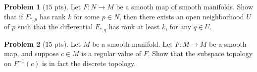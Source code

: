 \documentclass{amsart}
\newcommand{\+}[1]{\ensuremath{\mathbf{#1}}}
\newcommand{\R}{{\mathbb R}}
\theoremstyle{definition}
\newtheorem{prob}{Problem}
\begin{document}
\begin{comment}
\begin{prob}[$15$ pts]
Let $X = y^2 \frac{\partial}{\partial x}$ and $Y = x^2 \frac{\partial}{\partial y}$
be vector fields on $\R^2$.
Compute the Lie bracket $[X,Y]$.  Namely, determine smooth functions $f(x,y)$ and $g(x,y)$ for which
 $[X,Y] = f(x,y) \frac{\partial}{\partial x} + g(x,y) \frac{\partial}{\partial y}$.
\end{prob}


\vspace{3mm}
\end{comment}



\begin{comment}
\begin{prob}[$15$ pts]
Determine whether each of the following statements is true or false.  If false, provide a counterexample.  If true, briefly justify your answer.
\begin{enumerate}[(a)]
 \item Let $F: N \to M$ be a one-to-one immersion, and let $n$ and $m$ denote the dimensions of $N$ and $M$ respectively.
 For any point $q \in F(N) \subset M$, there exists a coordinate neighborhood $(U, x^1, \ldots, x^m)$ about $q$ such that
 $F(N) \cap U$ is defined by the vanishing of $x^1, \ldots, x^{m-n}$.
 \item Any alternating bilinear map $\omega \in A_2(\R^3)$ is \emph{decomposable}, 
 in the sense that $\omega = \alpha_1 \wedge \alpha_2$ for some
 covectors $\alpha_1, \alpha_2 \in V^*$.
  \item Any smooth vector field on the torus vanishes on at least one point.
\end{enumerate}
\end{prob}
\vspace{3mm}
\end{comment}


\begin{prob}[$15$ pts]
Let $F: N \to M$ be a smooth map of smooth manifolds.
Show that if $F_{*,p}$ has rank $k$ for some $p \in N$,
then there exists an open neighborhood $U$ of $p$ such that 
the differential $F_{*,q}$ has rank at least $k$, for any $q \in U$.
\end{prob}


\vspace{3mm}

\begin{prob}[$15$ pts]
 Let $M$ be a smooth manifold.  Let $F: M \to M$ be  a smooth map, and suppose $c \in M$ is a  regular value of $F$.
 Show that the subspace topology on $F^{-1}(c)$ is in fact the discrete topology. 
\end{prob}
\end{document}
